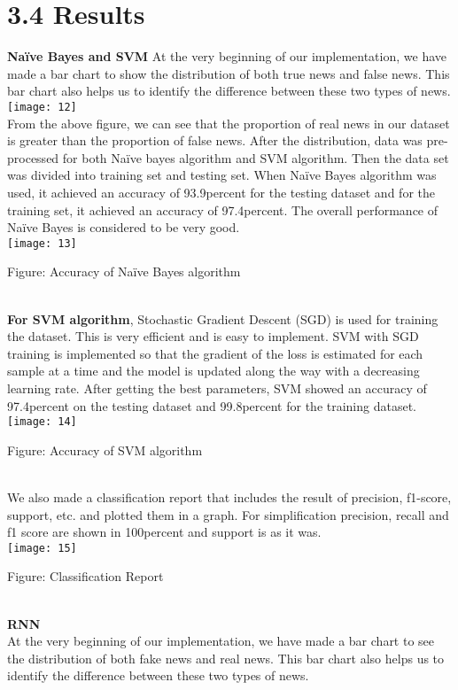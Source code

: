 \documentclass[12pt]{article}
\begin{document}
\section*{3.4 Results}
\textbf{Naïve Bayes and SVM}
At the very beginning of our implementation, we have made a bar chart to show the distribution of both true news and false news. This bar chart also helps us to identify the difference between these two types of news. \\
\texttt{[image: 12]}\\
From the above figure, we can see that the proportion of real news in our dataset is greater than the proportion of false news. After the distribution, data was pre-processed for both Naïve bayes algorithm and SVM algorithm. Then the data set was divided into training set and testing set. When Naïve Bayes algorithm was used, it achieved an accuracy of 93.9percent for the testing dataset and for the training set, it achieved an accuracy of 97.4percent. The overall performance of Naïve Bayes is considered to be very good. \\
\texttt{[image: 13]}\\
\centerline{Figure: Accuracy of Naïve Bayes algorithm}\\
\textbf{For SVM algorithm}, Stochastic Gradient Descent (SGD) is used for training the dataset. This is very efficient and is easy to implement. SVM with SGD training is implemented so that the gradient of the loss is estimated for each sample at a time and the model is updated along the way with a decreasing learning rate. After getting the best parameters, SVM showed an accuracy of 97.4percent on the testing dataset and 99.8percent for the training dataset.\\
\texttt{[image: 14]}\\
\centerline{Figure: Accuracy of SVM algorithm}\\
We also made a classification report that includes the result of precision, f1-score, support, etc. and plotted them in a graph. For simplification precision, recall and f1 score are shown in 100percent and support is as it was.\\
\texttt{[image: 15]}\\
\centerline{Figure: Classification Report}\\
\newpage
\textbf{RNN}\\
At the very beginning of our implementation, we have made a bar chart to see the distribution of both fake news and real news. This bar chart also helps us to identify the difference between these two types of news.\\ 
\end{document}
